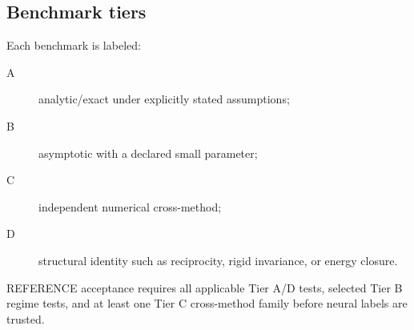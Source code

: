 \subsection{Benchmark tiers}

Each benchmark is labeled:
\begin{description}
\item[A] analytic/exact under explicitly stated assumptions;
\item[B] asymptotic with a declared small parameter;
\item[C] independent numerical cross-method;
\item[D] structural identity such as reciprocity, rigid invariance, or energy
  closure.
\end{description}

REFERENCE acceptance requires all applicable Tier A/D tests, selected Tier B
regime tests, and at least one Tier C cross-method family before neural labels
are trusted.
